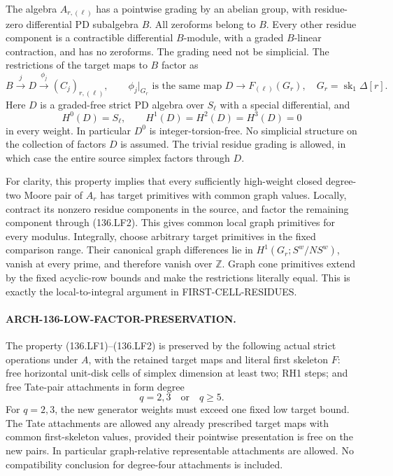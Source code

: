The algebra \(A_{r,(\ell)}\) has a pointwise grading by
an abelian group, with residue-zero differential PD subalgebra
\(B\). All zeroforms belong to \(B\). Every other
residue component is a contractible differential \(B\)-module,
with a graded \(B\)-linear contraction, and has no zeroforms.
The grading need not be simplicial. The restrictions of the
target maps to \(B\) factor as
\[
 B\xrightarrow{j}D\xrightarrow{\phi_j}(C_j)_{r,(\ell)},
 \qquad \phi_j|_{G_r}\text{ is the same map }D\to F_{(\ell)}(G_r),
 \quad G_r=\operatorname{sk}_1\Delta[r].                 \tag{136.LF1}
\]
Here \(D\) is a graded-free strict PD algebra over \(S_\ell\)
with a special differential, and
\[
                     H^0(D)=S_\ell,\qquad
                     H^1(D)=H^2(D)=H^3(D)=0              \tag{136.LF2}
\]
in every weight. In particular \(D^0\) is integer-torsion-free.
No simplicial structure on the collection of factors \(D\)
is assumed. The trivial residue grading is allowed, in which
case the entire source simplex factors through \(D\).

For clarity, this property implies that every sufficiently
high-weight closed degree-two Moore pair of \(A_r\) has
target primitives with common graph values. Locally, contract
its nonzero residue components in the source, and factor the
remaining component through (136.LF2). This gives common local
graph primitives for every modulus. Integrally, choose arbitrary
target primitives in the fixed comparison range. Their canonical
graph differences lie in \(H^1(G_r;S^w/NS^w)\), vanish
at every prime, and therefore vanish over \(\mathbb Z\).
Graph cone primitives extend by the fixed acyclic-row bounds
and make the restrictions literally equal. This is exactly the
local-to-integral argument in FIRST-CELL-RESIDUES.

\paragraph{ARCH-136-LOW-FACTOR-PRESERVATION.}
The property (136.LF1)--(136.LF2) is preserved by the following
actual strict operations under \(A\), with the retained
target maps and literal first skeleton \(F\): free horizontal
unit-disk cells of simplex dimension at least two; RH1 steps;
and free Tate-pair attachments in form degree
\[
                              q=2,3\quad\text{or}\quad q\geq5.
                                                               \tag{136.LF3}
\]
For \(q=2,3\), the new generator weights must exceed one
fixed low target bound. The Tate attachments are allowed any
already prescribed target maps with common first-skeleton values,
provided their pointwise presentation is free on the new pairs.
In particular graph-relative representable attachments are allowed.
No compatibility conclusion for degree-four attachments is included.

